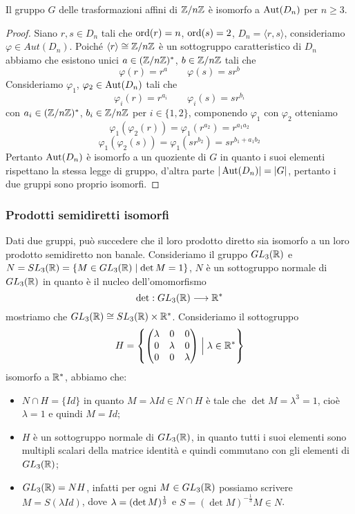 \documentclass[11pt]{scrartcl}
\begin{document}
\begin{proposition}
    Il gruppo $G$ delle trasformazioni affini di ${\mathbb Z}/n{\mathbb Z}$ è isomorfo a $\operatorname{Aut}(D_n)$
    per $n \geq 3$.
\end{proposition}

\begin{proof}
    Siano $r, s \in D_n$ tali che $\operatorname{ord}(r) = n$, $\operatorname{ord}(s) = 2$, $D_n = \langle r, s\rangle$,
    consideriamo $\varphi \in Aut(D_n)$. Poiché $\langle r\rangle \cong {\mathbb Z}/n{\mathbb Z}$ è un 
    sottogruppo caratteristico di $D_n$ abbiamo che esistono unici $a \in ({\mathbb Z}/n{\mathbb Z})^*$,
    $b \in {\mathbb Z}/n{\mathbb Z}$ tali che 
    \[
        \varphi(r) = r^a\qquad \varphi(s) = sr^b
    \]
    Consideriamo $\varphi_1$, $\varphi_2 \in \operatorname{Aut}(D_n)$ tali che
    \[
        \varphi_i(r) = r^{a_i} \qquad \varphi_i(s) = sr^{b_i}
    \]
    con $a_i \in ({\mathbb Z}/n{\mathbb Z})^*$, $b_i \in {\mathbb Z}/n{\mathbb Z}$ per $i \in \{1, 2\}$, componendo
    $\varphi_1$ con $\varphi_2$ otteniamo
    \[
        \varphi_1(\varphi_2(r)) = \varphi_1(r^{a_2}) = r^{a_1a_2}
    \]
    \[
        \varphi_1(\varphi_2(s)) = \varphi_1(sr^{b_2}) = sr^{b_1 + a_1b_2}
    \]
    Pertanto $\operatorname{Aut}(D_n)$ è isomorfo a un quoziente di $G$ in quanto i suoi
    elementi rispettano la stessa legge di gruppo, d'altra parte $|\operatorname{Aut}(D_n)| = |G|$,
    pertanto i due gruppi sono proprio isomorfi.
\end{proof}

\subsubsection{Prodotti semidiretti isomorfi}

Dati due gruppi, può succedere che il loro prodotto diretto sia isomorfo a 
un loro prodotto semidiretto non banale.\newline
Consideriamo il gruppo $GL_3(\mathbb R)$ e $N = SL_3(\mathbb R) = \{M \in GL_3(\mathbb R)
\mid \det M = 1\}$, $N$ è un sottogruppo normale di $GL_3(\mathbb R)$ in quanto è il nucleo
dell'omomorfismo
\[
    \det: GL_3(\mathbb R) \longrightarrow \mathbb R^*
\]
mostriamo che $GL_3(\mathbb R) \cong SL_3(\mathbb R)\times\mathbb R^*$. Consideriamo il sottogruppo
\[
    H = \left\{\begin{pmatrix}
    \lambda & 0 & 0\\
    0 & \lambda & 0\\
    0 & 0 & \lambda
    \end{pmatrix}\Bigm| \lambda \in \mathbb R^* \right\}
\]isomorfo a $\mathbb R^*$, abbiamo che:

\begin{itemize}
    \item $N \cap H = \{Id\}$ in quanto $M = \lambda Id \in N\cap H$ è tale
    che $\det M = \lambda^3 = 1$, cioè $\lambda = 1$ e quindi $M = Id$;
    \item $H$ è un sottogruppo normale di $GL_3(\mathbb R)$, in quanto tutti i suoi elementi
    sono multipli scalari della matrice identità e quindi commutano con gli
    elementi di $GL_3(\mathbb R)$;
    \item $GL_3(\mathbb R) = NH$, infatti per ogni $M \in GL_3(\mathbb R)$ possiamo scrivere $M = S(\lambda Id)$,
    dove $\lambda = \nolinebreak(\det M)^{\frac 1 3}$ e $S = (\det M)^{-\frac 1 3} M \in N$.
\end{itemize}
\end{document}
